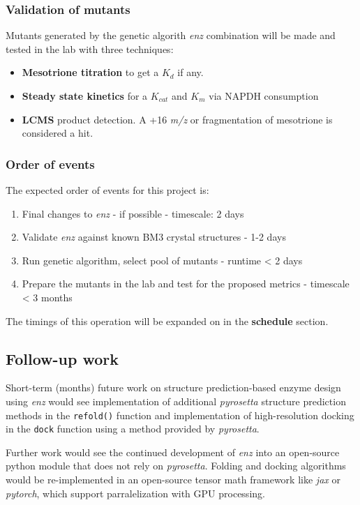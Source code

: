 \documentclass{article}
\begin{document}
\subsubsection{Validation of mutants}
Mutants generated by the genetic algorith \textit{enz} combination will be made and tested in the lab with three techniques:%
\begin{itemize}
\item \textbf{Mesotrione titration} to get a $K_d$ if any.
\item \textbf{Steady state kinetics} for a $K_{cat}$ and $K_m$ via NAPDH consumption
\item \textbf{LCMS} product detection. A +16 \textit{m/z} or fragmentation of mesotrione is considered a hit.
\end{itemize}
\par
\subsubsection{Order of events}
The expected order of events for this project is:
\begin{enumerate}
\item Final changes to \textit{enz} - if possible - timescale: 2 days
\item Validate \textit{enz} against known BM3 crystal structures - 1-2 days
\item Run genetic algorithm, select pool of mutants - runtime < 2 days
\item Prepare the mutants in the lab and test for the proposed metrics - timescale < 3 months
\end{enumerate}
The timings of this operation will be expanded on in the \textbf{schedule} section.

\subsection{Follow-up work}
Short-term (months) future work on structure prediction-based enzyme design using \textit{enz} would see implementation of additional \textit{pyrosetta} structure prediction methods in the \texttt{refold()} function and implementation of high-resolution docking in the \texttt{dock} function using a method provided by \textit{pyrosetta}. %
\par
Further work would see the continued development of \textit{enz} into an open-source python module that does not rely on \textit{pyrosetta}. Folding and docking algorithms would be re-implemented in an open-source tensor math framework like \textit{jax} or \textit{pytorch}, which support parralelization with GPU processing. %
\end{document}
